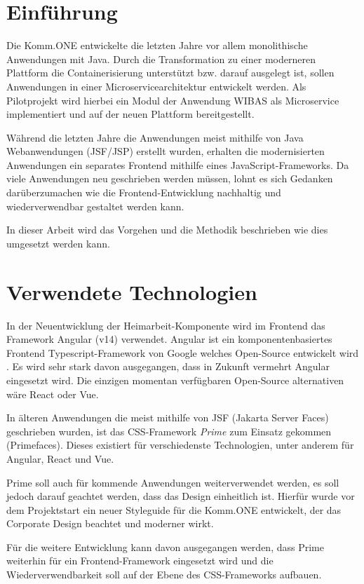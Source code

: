 \chapter{Einführung}

Die Komm.ONE entwickelte die letzten Jahre vor allem monolithische Anwendungen mit Java. Durch die Transformation zu einer moderneren Plattform die Containerisierung unterstützt bzw. darauf ausgelegt ist, sollen Anwendungen in einer Microservicearchitektur entwickelt werden. Als Pilotprojekt wird hierbei ein Modul der Anwendung WIBAS als Microservice implementiert und auf der neuen Plattform bereitgestellt.

Während die letzten Jahre die Anwendungen meist mithilfe von Java Webanwendungen (JSF/JSP) erstellt wurden, erhalten die modernisierten Anwendungen ein separates Frontend mithilfe eines JavaScript-Frameworks. Da viele Anwendungen neu geschrieben werden müssen, lohnt es sich Gedanken darüberzumachen wie die Frontend-Entwicklung nachhaltig und wiederverwendbar gestaltet werden kann.

In dieser Arbeit wird das Vorgehen und die Methodik beschrieben wie dies umgesetzt werden kann.

\chapter{Verwendete Technologien}

In der Neuentwicklung der Heimarbeit-Komponente wird im Frontend das Framework Angular (v14) verwendet. Angular ist ein komponentenbasiertes Frontend Typescript-Framework von Google welches Open-Source entwickelt wird \cite{angular.17.01.2023}. Es wird sehr stark davon ausgegangen, dass in Zukunft vermehrt Angular eingesetzt wird. Die einzigen momentan verfügbaren Open-Source alternativen wäre React oder Vue.

In älteren Anwendungen die meist mithilfe von JSF (Jakarta Server Faces) geschrieben wurden, ist das CSS-Framework \textit{Prime} zum Einsatz gekommen (Primefaces). Dieses existiert für verschiedenste Technologien, unter anderem für Angular, React und Vue.

Prime soll auch für kommende Anwendungen weiterverwendet werden, es soll jedoch darauf geachtet werden, dass das Design einheitlich ist. Hierfür wurde vor dem Projektstart ein neuer Styleguide für die Komm.ONE entwickelt, der das Corporate Design beachtet und moderner wirkt.

Für die weitere Entwicklung kann davon ausgegangen werden, dass Prime weiterhin für ein Frontend-Framework eingesetzt wird und die Wiederverwendbarkeit soll auf der Ebene des CSS-Frameworks aufbauen. 

